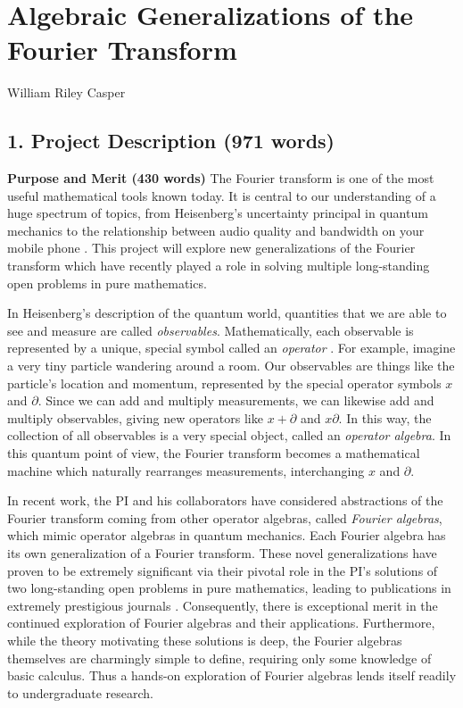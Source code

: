 \documentclass[12pt,letterpaper]{article}
\newcommand{\required}[1]{\section*{\hfil #1\hfil}}                    %
\theoremstyle{definition}
\begin{document}
\required{Algebraic Generalizations of the Fourier Transform}
\begin{center}
William Riley Casper
\end{center}

\subsection*{\hfil 1. Project Description (971 words)\hfil}

\noindent\textbf{Purpose and Merit (430 words)}
The Fourier transform is one of the most useful mathematical tools known today.  It is central to our understanding of a huge spectrum of topics, from Heisenberg's uncertainty principal in quantum mechanics to the relationship between audio quality and bandwidth on your mobile phone \cite{shannon1}.
This project will explore new generalizations of the Fourier transform which have recently played a role in solving multiple long-standing open problems in pure mathematics.

In Heisenberg's description of the quantum world, quantities that we are able to see and measure are called \textit{observables}.  Mathematically, each observable is represented by a unique, special symbol called an \textit{operator} \cite{sakurai}.  For example, imagine a very tiny particle wandering around a room.  Our observables are things like the particle's location and momentum, represented by the special operator symbols $x$ and $\partial$.  Since we can add and multiply measurements, we can likewise add and multiply observables, giving new operators like $x+\partial$ and $x\partial$.  In this way, the collection of all observables is a very special object, called an \textit{operator algebra}.
In this quantum point of view, the Fourier transform becomes a mathematical machine which naturally rearranges measurements, interchanging $x$ and $\partial$.

In recent work, the PI and his collaborators have considered abstractions of the Fourier transform coming from other operator algebras, called \textit{Fourier algebras}, which mimic operator algebras in quantum mechanics.  Each Fourier algebra has its own generalization of a Fourier transform.  These novel generalizations have proven to be extremely significant via their pivotal role in the PI's solutions of two long-standing open problems in pure mathematics, leading to publications in extremely prestigious journals \cite{CGYZ,CGYZ2,CY2019,CY2018}.  Consequently, there is exceptional merit in the continued exploration of Fourier algebras and their applications.
Furthermore, while the theory motivating these solutions is deep, the Fourier algebras themselves are charmingly simple to define, requiring only some knowledge of basic calculus.  Thus a hands-on exploration of Fourier algebras lends itself readily to undergraduate research.
\end{document}

